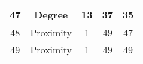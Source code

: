 \documentclass[results.tex]{subfiles}
\begin{document}
\begin{center}
\begin{tabular}{| c || c | c | c | c |}
            \hline
            47                      & Degree                       & 13                     & 37                      & 35                   \\
            \hline
            48                      & Proximity                    & 1                      & 49                      & 47                   \\
            \hline
            49                      & Proximity                    & 1                      & 49                      & 49                   \\
            \hline
        \end{tabular}
    \end{center}
\end{document}
